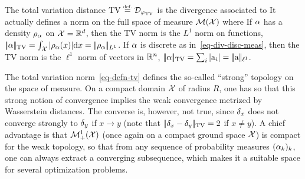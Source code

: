 \begin{example}\label{exmp-tv}
The total variation distance $\operatorname{TV} \stackrel{\mbox{\upshape\tiny def.}}{=} \mathcal{D}_{\varphi_{\operatorname{TV}}}$ is the divergence associated to
It actually defines a norm on the full space of measure $\mathcal{M}(\mathcal{X})$ where
If $\alpha$ has a density $\rho_{\alpha}$ on $\mathcal{X}=\mathbb{R}^d$, then the TV norm is the $L^1$ norm on functions, $|\!| \alpha |\!|_{\operatorname{TV}} = \int_{\mathcal{X}} |\rho_{\alpha}(x)| \mathrm{d} x = |\!| \rho_{\alpha} |\!|_{L^1}$.
%
If $\alpha$ is discrete as in~\eqref{eq-div-disc-meas}, then the TV norm is the $\ell^1$ norm of vectors in $\mathbb{R}^n$, $|\!| \alpha |\!|_{\operatorname{TV}}=\sum_i |\mathrm{a}_i| = |\!| \mathrm{a} |\!|_{\ell^1}$.
\end{example}

\begin{rem}
	The total variation norm~\eqref{eq-defn-tv} defines the so-called ``strong'' topology on the space of measure. 
	On a compact domain $\mathcal{X}$ of radius $R$, one has 
	so that this strong notion of convergence implies the weak convergence metrized by Wasserstein distances. 
	The converse is, however, not true, since $\delta_x$ does not converge strongly to $\delta_y$ if $x \rightarrow y$ (note that
	$|\!| \delta_x-\delta_y |\!|_{\operatorname{TV}}=2$ if $x \neq y$). 
	A chief advantage is that $\mathcal{M}_+^1(\mathcal{X})$ (once again on a compact ground space $\mathcal{X}$) is compact for the weak topology, so that from any sequence of probability measures $(\alpha_k)_k$, one can always extract a converging subsequence, which makes it a suitable space for several optimization problems. %
\end{rem}

